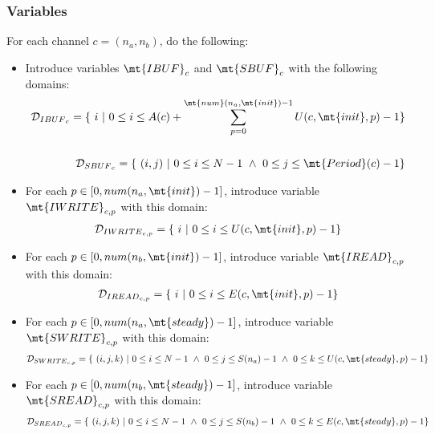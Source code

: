 \subsubsection{Variables}

For each channel $c = (n_a, n_b)$, do the following:
\begin{itemize}

\item Introduce variables $\mt{IBUF}_c$ and $\mt{SBUF}_c$ with the following domains:
\begin{align*}
{\cal D}_{{IBUF}_c} = \{~i~|~0 \le i \le A(c) +
\sum_{p=0}^{\mt{num}(n_a, \mt{init})-1} U(c, \mt{init}, p) - 1 \} \\ ~ \\
%
{\cal D}_{{SBUF}_c} = \{ ~(i,j)~|~0 \le i \le N - 1 ~\wedge~ 0 \le j \le \mt{Period}(c) - 1\}
\end{align*}

\item For each $p \in [0, num(n_a, \mt{init})-1]$, introduce
variable $\mt{IWRITE}_{c, p}$ with this domain:
\begin{align*}
{\cal D}_{{IWRITE}_{c, p}} = \{~i~|~0 \le i \le U(c, \mt{init}, p) - 1\} \\
\end{align*}

\item For each $p \in [0, num(n_b, \mt{init})-1]$, introduce
variable $\mt{IREAD}_{c, p}$ with this domain:
\begin{align*}
{\cal D}_{{IREAD}_{c, p}} = \{~i~|~0 \le i \le E(c, \mt{init}, p) - 1\} \\
\end{align*}

\item For each $p \in [0, num(n_a, \mt{steady})-1]$, introduce
variable $\mt{SWRITE}_{c, p}$ with this domain:
\begin{align*}
{\cal D}_{{SWRITE}_{c, p}} = \{~(i,j,k)~|~0 \le i \le N-1 ~\wedge~ 0 \le j \le S(n_a) - 1 ~\wedge~ 0 \le k \le U(c, \mt{steady}, p) - 1\} \\
\end{align*}

\item For each $p \in [0, num(n_b, \mt{steady})-1]$, introduce
variable $\mt{SREAD}_{c, p}$ with this domain:
\begin{align*}
{\cal D}_{{SREAD}_{c, p}} = \{~(i,j,k)~|~0 \le i \le N-1 ~\wedge~ 0 \le j \le S(n_b) - 1 ~\wedge~ 0 \le k \le E(c, \mt{steady}, p) - 1\} \\
\end{align*}

\end{itemize}


